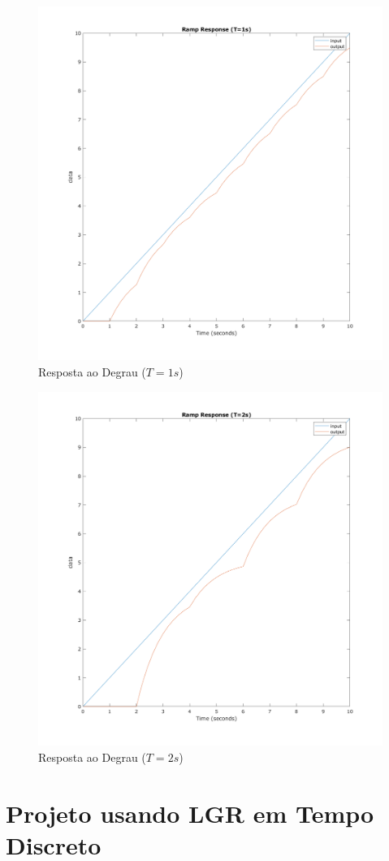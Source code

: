 \documentclass[a4paper,11pt]{article}
\begin{document}
\begin{figure}[H]
    \centering
    \includegraphics[width=0.8\linewidth]{img/exsim3-ramp-t1000ms.png}
    \caption{ Resposta ao Degrau ($T=1s$)}
\end{figure}

\begin{figure}[H]
    \centering
    \includegraphics[width=0.8\linewidth]{img/exsim3-ramp-t2000ms.png}
    \caption{ Resposta ao Degrau ($T=2s$)}
\end{figure}

\section{Projeto usando LGR em Tempo Discreto}
\end{document}
